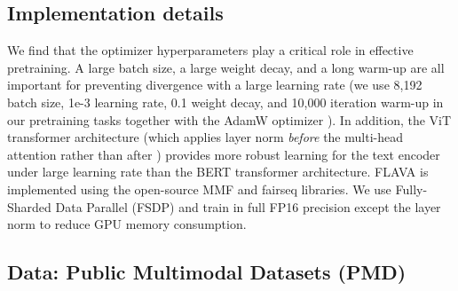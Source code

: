 \documentclass[10pt,twocolumn,letterpaper]{article}
\newcommand{\CMD}{PMD\xspace}
\begin{document}
\subsection{Implementation details}
\label{sec:model:insights}

We find that the optimizer hyperparameters play a critical role in effective pretraining. A large batch size, a large weight decay, and a long warm-up are all important for preventing divergence with a large learning rate (we use 8,192 batch size, 1e-3 learning rate, 0.1 weight decay, and 10,000 iteration warm-up in our pretraining tasks together with the AdamW optimizer \cite{loshchilov2019decoupled,kingma2014adam}). In addition, the ViT transformer architecture (which applies layer norm \cite{ba2016layernorm} \emph{before} the multi-head attention rather than after \cite{xiong2020layer}) provides more robust learning for the text encoder under large learning rate than the BERT \cite{devlin2018bert} transformer architecture. FLAVA is implemented using the open-source MMF \cite{singh2020mmf} and fairseq \cite{ott2019fairseq} libraries. We use Fully-Sharded Data Parallel (FSDP) \cite{rajbhandari2019zero,rajbhandari2021zero} and train in full FP16 precision except the layer norm \cite{ba2016layernorm} to reduce GPU memory consumption.

\subsection{Data: Public Multimodal Datasets (\CMD)}
\label{sec:dataset}

\begin{table}[t]
\small
{}
\vspace{-0.5em}
\caption{Public Multimodal Datasets (\CMD) corpus used in FLAVA multimodal pretraining, which consists of publicly available datasets with a total size of 70M image and text pairs.}
\label{tab:datasets}
\vspace{-1em}
\end{table}
\end{document}
